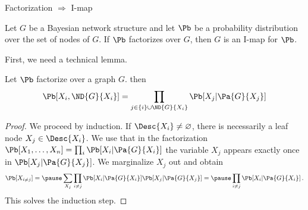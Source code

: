     \begin{frame}{Factorization $\Rightarrow$ I-map}
    \begin{theorem}
    Let $G$ be a Bayesian network structure and let $\Pb$ be a probability distribution over the set of nodes of $G$.
    If $\Pb$ factorizes over $G$, then $G$ is an I-map for $\Pb$.
    \end{theorem}
    \pause
    First, we need a technical lemma.
    \begin{lemma}
        \label{lemma:Bayesian-network-restriction}
    Let $\Pb$ factorize over a graph $G$. then
    \begin{equation}
    \Pb[X_i, \ND{G}{X_i}] = \prod_{j \in \{i\} \cup \ND{G}{X_i}} \Pb[X_j | \Pa{G}{X_j}]
    \end{equation}
    \end{lemma}
    \pause
    \begin{proof}
        We proceed by induction.
        If $\Desc{X_i} \neq \varnothing$, there is necessarily a leaf node $X_j \in \Desc{X_i}$.
        \pause
        We use that in the factorization $\Pb[X_1,\ldots,X_n] = \prod_{i} \Pb[X_i | \Pa{G}{X_i}]$ the variable $X_j$ appears exactly once in $\Pb[X_j | \Pa{G}{X_j}]$. 
        \pause
        We marginalize $X_j$ out and obtain
        \begin{equation}
            \Pb[X_{i \neq j}] = 
            \pause  \sum_{X_j} \prod_{i \neq j} \Pb[X_i | \Pa{G}{X_i}] \Pb[X_j | \Pa{G}{X_j}]
            = \pause \prod_{i \neq j} \Pb[X_i | \Pa{G}{X_i}] \,.
        \end{equation}
        \pause
        This solves the induction step.
    \end{proof}
    \end{frame}

